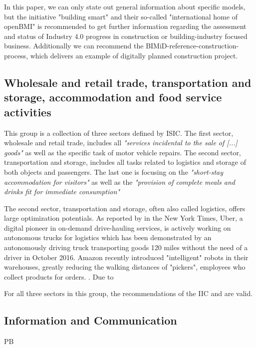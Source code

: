 In this paper, we can only state out general information about specific models, but the initiative "building smart" %
and their so-called "international home of openBMI" is recommended to get further information regarding the assessment and status of Industry 4.0 progress in construction or building-industry focused business. Additionally we can recommend the BIMiD-reference-construction-process, which delivers an example of digitally planned construction project. %

   


\subsection{Wholesale and retail trade, transportation and storage, accommodation and food service activities}

This group is a collection of three sectors defined by \ac{ISIC}. The first sector, wholesale and retail trade, includes all \emph{"services incidental to the sale of [...] goods"}\cite[p.179]{ISIC:2008} as well as the specific task of motor vehicle repairs. The second sector, transportation and storage, includes all tasks related to logistics and storage of both objects and passengers.\cite[p.194]{ISIC:2008} The last one is focusing on the \emph{"short-stay accommodation for visitors"} as well as the \emph{"provision of complete meals and drinks fit for immediate consumption"}\cite[p.202]{ISIC:2008} 

The second sector, transportation and storage, often also called logistics, offers large optimization potentials. As reported by \citeauthor{nytimesdrivingtruck:2016} in the New York Times, Uber, a digital pioneer in on-demand drive-hauling services, is actively working on autonomous trucks for logistics which has been demonstrated by an autonomously driving truck transporting goods 120 miles without the need of a driver in October 2016. Amazon recently introduced "intelligent" robots in their warehouses, greatly reducing the walking distances of "pickers", employees who collect products for orders. \cite{Kiva:amazon:Ma:2016:OTA:2936924.2937092}. Due to 

For all three sectors in this group, the recommendations of the \ac{IIC} and \cite{I4.0Init} are valid. 



\subsection{Information and Communication}
PB

